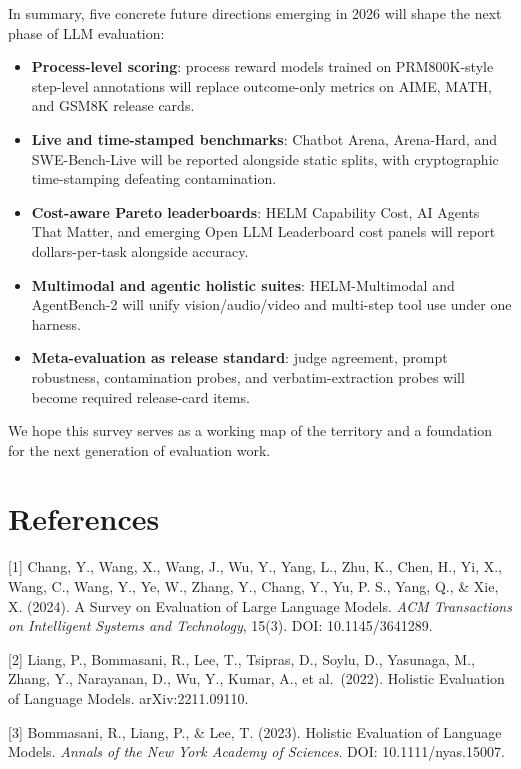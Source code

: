 In summary, five concrete future directions emerging in 2026 will shape the next phase of LLM evaluation:

\begin{itemize}
\tightlist
\item
  \textbf{Process-level scoring}: process reward models trained on PRM800K-style step-level annotations will replace outcome-only metrics on AIME, MATH, and GSM8K release cards.
\item
  \textbf{Live and time-stamped benchmarks}: Chatbot Arena, Arena-Hard, and SWE-Bench-Live will be reported alongside static splits, with cryptographic time-stamping defeating contamination.
\item
  \textbf{Cost-aware Pareto leaderboards}: HELM Capability Cost, AI Agents That Matter, and emerging Open LLM Leaderboard cost panels will report dollars-per-task alongside accuracy.
\item
  \textbf{Multimodal and agentic holistic suites}: HELM-Multimodal and AgentBench-2 will unify vision/audio/video and multi-step tool use under one harness.
\item
  \textbf{Meta-evaluation as release standard}: judge agreement, prompt robustness, contamination probes, and verbatim-extraction probes will become required release-card items.
\end{itemize}

We hope this survey serves as a working map of the territory and a foundation for the next generation of evaluation work.

\section{References}\label{references}

{[}1{]} Chang, Y., Wang, X., Wang, J., Wu, Y., Yang, L., Zhu, K., Chen, H., Yi, X., Wang, C., Wang, Y., Ye, W., Zhang, Y., Chang, Y., Yu, P. S., Yang, Q., \& Xie, X. (2024). A Survey on Evaluation of Large Language Models. \emph{ACM Transactions on Intelligent Systems and Technology}, 15(3). DOI: 10.1145/3641289.

{[}2{]} Liang, P., Bommasani, R., Lee, T., Tsipras, D., Soylu, D., Yasunaga, M., Zhang, Y., Narayanan, D., Wu, Y., Kumar, A., et al.~(2022). Holistic Evaluation of Language Models. arXiv:2211.09110.

{[}3{]} Bommasani, R., Liang, P., \& Lee, T. (2023). Holistic Evaluation of Language Models. \emph{Annals of the New York Academy of Sciences}. DOI: 10.1111/nyas.15007.

